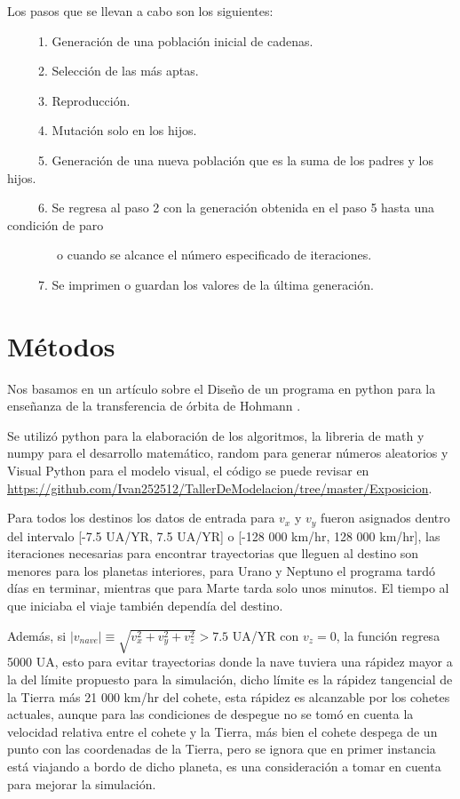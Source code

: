 \documentclass[12pt,letterpaper]{article}
\begin{document}
Los pasos que se llevan a cabo son los siguientes:

\ \ \ \ \ 1. Generación de una población inicial de cadenas.

\ \ \ \ \ 2. Selección de las más aptas.

\ \ \ \ \ 3. Reproducción.

\ \ \ \ \ 4. Mutación solo en los hijos.

\ \ \ \ \ 5. Generación de una nueva población que es la suma de los padres y los hijos.

\ \ \ \ \ 6. Se regresa al paso 2 con la generación obtenida en el paso 5 hasta una condición de paro 

\ \ \ \ \ \ \ \ o cuando se alcance el número especificado de iteraciones.

\ \ \ \ \ 7. Se imprimen o guardan los valores de la última generación.

\section*{Métodos}

Nos basamos en un artículo sobre el Diseño de un programa en python para la enseñanza de la transferencia de
órbita de Hohmann \citep{mendez2016diseno}.

Se utilizó python para la elaboración de los algoritmos, la libreria de math y numpy para el desarrollo matemático, random para generar números aleatorios y Visual Python para el modelo visual, el código se puede revisar en \url{https://github.com/Ivan252512/TallerDeModelacion/tree/master/Exposicion}.

Para todos los destinos los datos de entrada para $v_x$ y $v_y$ fueron asignados dentro del intervalo [-7.5 UA/YR, 7.5 UA/YR] o [-128 000 km/hr, 128 000 km/hr], las iteraciones necesarias para encontrar trayectorias que lleguen al destino son menores  para los planetas interiores, para Urano y Neptuno el programa tardó días en terminar, mientras que para Marte tarda solo unos minutos. El tiempo al que iniciaba el viaje también dependía del destino.

Además, si $|v_{nave}|\equiv \sqrt{v_x^2+v_y^2+v_z^2}>7.5$ UA/YR con $v_z=0$, la función regresa 5000 UA, esto para evitar trayectorias donde la nave tuviera una rápidez mayor a la del límite propuesto para la simulación, dicho límite 
es la rápidez tangencial de la Tierra más 21 000 km/hr del cohete, esta rápidez es alcanzable por los cohetes actuales, aunque para las condiciones de despegue no se tomó en cuenta la velocidad relativa entre el cohete y la Tierra, más bien el cohete despega de un punto con las coordenadas de la Tierra, pero se ignora que en primer instancia está viajando a bordo de dicho planeta, es una consideración a tomar en cuenta para mejorar la simulación.
\end{document}

